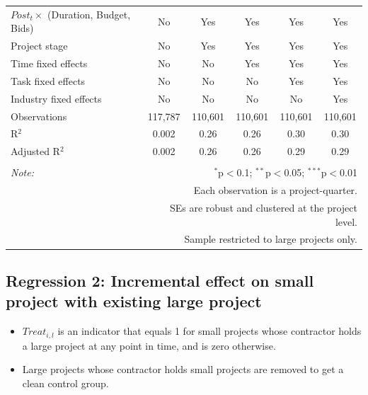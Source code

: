 \documentclass[
]{article}
\providecommand{\tightlist}{%
  \setlength{\itemsep}{0pt}\setlength{\parskip}{0pt}}
\begin{document}
\begin{table}[H]
\begin{tabular}{@{\extracolsep{-10pt}}lccccc}
$Post_t \times $  (Duration, Budget, Bids) & No & Yes & Yes & Yes & Yes \\ 
Project stage & No & Yes & Yes & Yes & Yes \\ 
Time fixed effects & No & No & Yes & Yes & Yes \\ 
Task fixed effects & No & No & No & Yes & Yes \\ 
Industry fixed effects & No & No & No & No & Yes \\ 
Observations & 117,787 & 110,601 & 110,601 & 110,601 & 110,601 \\ 
R$^{2}$ & 0.002 & 0.26 & 0.26 & 0.30 & 0.30 \\ 
Adjusted R$^{2}$ & 0.002 & 0.26 & 0.26 & 0.29 & 0.29 \\ 
\hline 
\hline \\[-1.8ex] 
\textit{Note:}  & \multicolumn{5}{r}{$^{*}$p$<$0.1; $^{**}$p$<$0.05; $^{***}$p$<$0.01} \\ 
 & \multicolumn{5}{r}{Each observation is a project-quarter.} \\ 
 & \multicolumn{5}{r}{SEs are robust and clustered at the project level.} \\ 
 & \multicolumn{5}{r}{Sample restricted to large projects only.} \\ 
\end{tabular} 
\end{table}

\hypertarget{regression-2-incremental-effect-on-small-project-with-existing-large-project}{%
\subsection{Regression 2: Incremental effect on small project with
existing large
project}\label{regression-2-incremental-effect-on-small-project-with-existing-large-project}}

\begin{itemize}
\tightlist
\item
  \(Treat_{i,l}\) is an indicator that equals 1 for small projects whose
  contractor holds a large project at any point in time, and is zero
  otherwise.
\item
  Large projects whose contractor holds small projects are removed to
  get a clean control group.
\end{itemize}
\end{document}

